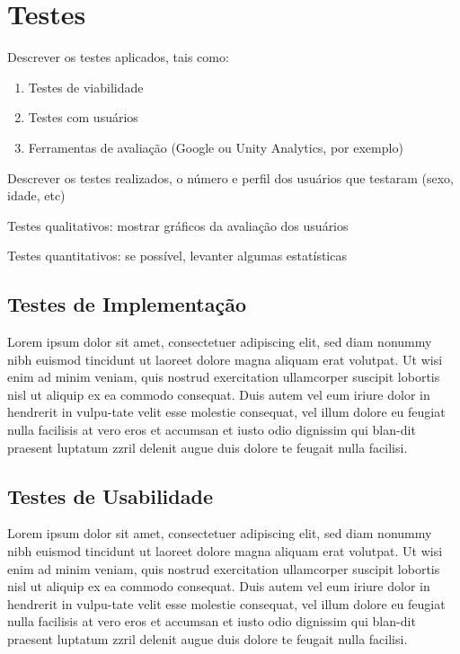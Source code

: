 \section{Testes}
\label{secao:testes}
Descrever os testes aplicados, tais como:
\begin{enumerate}
    \item Testes de viabilidade
    \item Testes com usuários
    \item Ferramentas de avaliação (Google ou Unity Analytics, por exemplo)
    
\end{enumerate}

Descrever os testes realizados, o número e perfil dos usuários que testaram (sexo, idade, etc)

Testes qualitativos: mostrar gráficos da avaliação dos usuários

Testes quantitativos: se possível, levanter algumas estatísticas


\subsection{Testes de Implementação}
\label{secao:testes_de_implementacao}
Lorem ipsum dolor sit amet, consectetuer adipiscing elit, sed diam nonummy nibh euismod tincidunt ut laoreet dolore magna aliquam erat volutpat. Ut wisi enim ad minim veniam, quis nostrud exercitation ullamcorper suscipit lobortis nisl ut aliquip ex ea commodo consequat. Duis autem vel eum iriure dolor in hendrerit in vulpu-tate velit esse molestie consequat, vel illum dolore eu feugiat nulla facilisis at vero eros et accumsan et iusto odio dignissim qui blan-dit praesent luptatum zzril delenit augue duis dolore te feugait nulla facilisi.

\subsection{Testes de Usabilidade}
\label{secao:testes_de_usabilidade}
Lorem ipsum dolor sit amet, consectetuer adipiscing elit, sed diam nonummy nibh euismod tincidunt ut laoreet dolore magna aliquam erat volutpat. Ut wisi enim ad minim veniam, quis nostrud exercitation ullamcorper suscipit lobortis nisl ut aliquip ex ea commodo consequat. Duis autem vel eum iriure dolor in hendrerit in vulpu-tate velit esse molestie consequat, vel illum dolore eu feugiat nulla facilisis at vero eros et accumsan et iusto odio dignissim qui blan-dit praesent luptatum zzril delenit augue duis dolore te feugait nulla facilisi.


